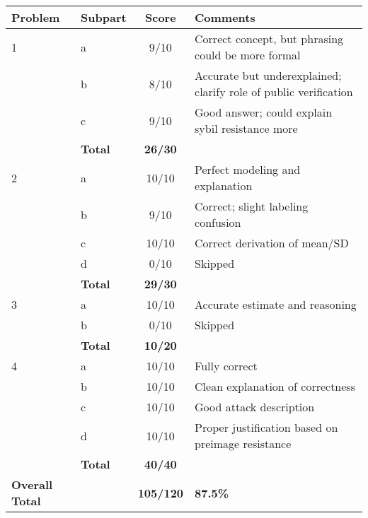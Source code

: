 \documentclass[11pt]{article}
\begin{document}
\begin{tabular}{@{}llcl@{}}
\toprule
\textbf{Problem} & \textbf{Subpart} & \textbf{Score} & \textbf{Comments} \\
\midrule
1 & a & 9/10 & Correct concept, but phrasing could be more formal \\
\cmidrule(lr){2-4}
    & b & 8/10 & Accurate but underexplained; clarify role of public verification \\
\cmidrule(lr){2-4}
    & c & 9/10 & Good answer; could explain sybil resistance more \\
\cmidrule(lr){2-4}
    & \textbf{Total} & \textbf{26/30} & \\
\midrule
2 & a & 10/10 & Perfect modeling and explanation \\
\cmidrule(lr){2-4}
    & b & 9/10 & Correct; slight labeling confusion \\
\cmidrule(lr){2-4}
    & c & 10/10 & Correct derivation of mean/SD \\
\cmidrule(lr){2-4}
    & d & 0/10 & Skipped \\
\cmidrule(lr){2-4}
    & \textbf{Total} & \textbf{29/30} & \\
\midrule
3 & a & 10/10 & Accurate estimate and reasoning \\
\cmidrule(lr){2-4}
    & b & 0/10 & Skipped \\
\cmidrule(lr){2-4}
    & \textbf{Total} & \textbf{10/20} & \\
\midrule
4 & a & 10/10 & Fully correct \\
\cmidrule(lr){2-4}
    & b & 10/10 & Clean explanation of correctness \\
\cmidrule(lr){2-4}
    & c & 10/10 & Good attack description \\
\cmidrule(lr){2-4}
    & d & 10/10 & Proper justification based on preimage resistance \\
\cmidrule(lr){2-4}
    & \textbf{Total} & \textbf{40/40} & \\
\midrule
\textbf{Overall Total} &  & \textbf{105/120} & \textbf{87.5\%} \\
\bottomrule
\end{tabular}
\end{document}

